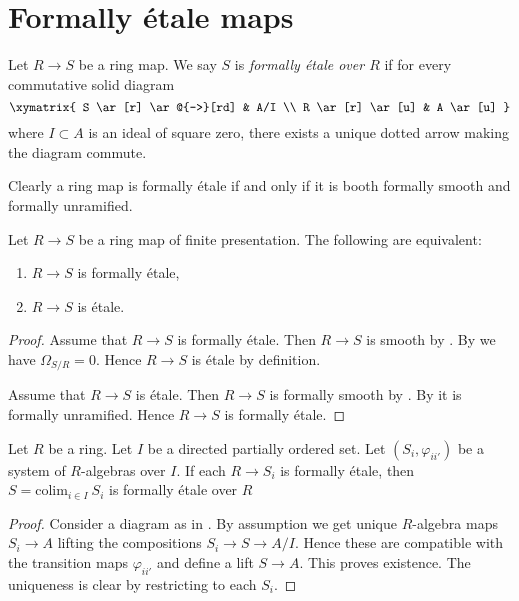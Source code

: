 \section{Formally \'etale maps}
\label{section-formally-etale}

\begin{definition}
\label{definition-formally-etale}
Let $R \to S$ be a ring map.
We say $S$ is {\it formally \'etale over $R$} if for every
commutative solid diagram
$$
\xymatrix{
S \ar[r] \ar@{-->}[rd] & A/I \\
R \ar[r] \ar[u] & A \ar[u]
}
$$
where $I \subset A$ is an ideal of square zero, there exists
a unique dotted arrow making the diagram commute.
\end{definition}

\noindent
Clearly a ring map is formally \'etale if and only if
it is booth formally smooth and formally unramified.

\begin{lemma}
\label{lemma-formally-etale-etale}
Let $R \to S$ be a ring map of finite presentation.
The following are equivalent:
\begin{enumerate}
\item $R \to S$ is formally \'etale,
\item $R \to S$ is \'etale.
\end{enumerate}
\end{lemma}

\begin{proof}
Assume that $R \to S$ is formally \'etale.
Then $R \to S$ is smooth by .
By 
we have $\Omega_{S/R} = 0$.
Hence $R \to S$ is \'etale by definition.

\medskip\noindent
Assume that $R \to S$ is \'etale.
Then $R \to S$ is formally smooth by
.
By 
it is formally unramified. Hence $R \to S$ is formally \'etale.
\end{proof}

\begin{lemma}
\label{lemma-colimit-formally-etale}
Let $R$ be a ring. Let $I$ be a directed partially ordered set.
Let $(S_i, \varphi_{ii'})$ be a system of $R$-algebras
over $I$. If each $R \to S_i$ is formally \'etale, then
$S = \text{colim}_{i \in I}\ S_i$ is formally \'etale over $R$
\end{lemma}

\begin{proof}
Consider a diagram as in .
By assumption we get unique $R$-algebra maps $S_i \to A$ lifting
the compositions $S_i \to S \to A/I$. Hence these are compatible
with the transition maps $\varphi_{ii'}$ and define a lift
$S \to A$. This proves existence.
The uniqueness is clear by restricting to each $S_i$.
\end{proof}


